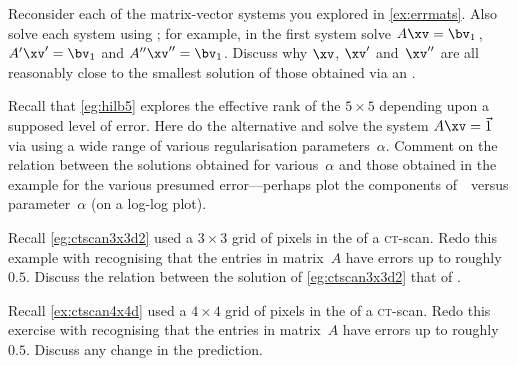 \begin{exercise} \label{ex:} 
Reconsider each of the matrix-vector systems you explored in \autoref{ex:errmats}.
Also solve each system using ; for example, in the first system solve \(A\xv=\bv_1\)\,, \(A'\xv'=\bv_1\) and \(A''\xv''=\bv_1\).
Discuss why \(\xv\), \(\xv'\) and~\(\xv''\) are all reasonably close to the smallest solution of those obtained via an \svd.
\end{exercise}




\begin{exercise} \label{ex:} 
Recall that \autoref{eg:hilb5} explores the effective rank of the \(5\times5\)  depending upon a supposed level of error.
Here do the alternative and solve the system \(A\xv=\vec 1\) via  using a wide range of various regularisation parameters~\(\alpha\).
Comment on the relation between the solutions obtained for various~\(\alpha\) and those obtained in the example for the various presumed error---perhaps plot the components of~\xv\ versus parameter~\(\alpha\) (on a log-log plot).
\end{exercise}




\begin{exercise} \label{ex:} 
Recall \autoref{eg:ctscan3x3d2} used a \(3\times3\) grid of pixels in the  of a \textsc{ct}-scan.
Redo this example with  recognising that the entries in matrix~\(A\) have errors up to roughly~\(0.5\).
Discuss the relation between the solution of \autoref{eg:ctscan3x3d2} that of .
\end{exercise}




\begin{exercise} \label{ex:} 
Recall \autoref{ex:ctscan4x4d} used a \(4\times4\) grid of pixels in the  of a \textsc{ct}-scan.
Redo this exercise with  recognising that the entries in matrix~\(A\) have errors up to roughly~\(0.5\).
Discuss any change in the prediction.
\end{exercise}








\begin{comment}%
why, what caused X?
how did X occur?
what-if? what-if-not?
how does X compare with Y?
what is the evidence for X?
why is X important?
\end{comment}






